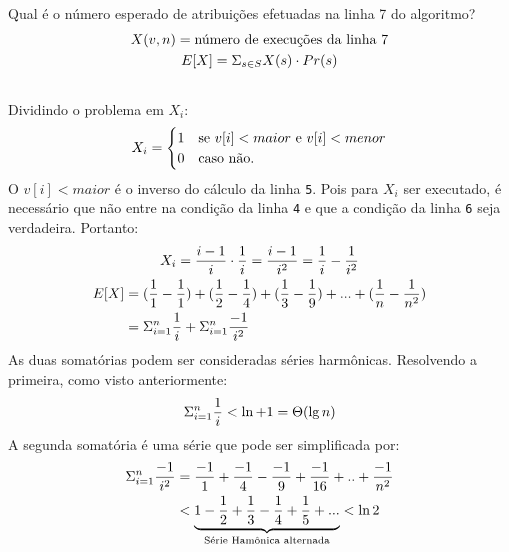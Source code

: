 \documentclass[12pt,a4paper]{article}
\begin{document}
     Qual é o número esperado de atribuições efetuadas na linha 7 do algoritmo?
    \begin{multline}
        X(v, n) = \text{número de execuções da linha 7} \\
        E[X] = \Sigma_{s \in S} X(s) \cdot Pr(s) \\
        \notag
    \end{multline}
    Dividindo o problema em $X_i$:
    \begin{equation}
        X_i =
            \begin{cases}
                1 & \text{se $v[i] < maior$ e $v[i] < menor$} \\
                0 & \text{caso não.} \\
            \end{cases}
    \notag
    \end{equation}
    O $v[i] < maior$ é o inverso do cálculo da linha \verb|5|. Pois para $X_i$
    ser executado, é necessário que não entre na condição da linha \verb|4| e
    que a condição da linha \verb|6| seja verdadeira. Portanto:
    \begin{multline}
        X_i = \frac{i-1}{i} \cdot \frac{1}{i} = \frac{i-1}{i^2} = \frac{1}{i} - \frac{1}{i^2} \\
        \begin{split}
        E[X] &= (\frac{1}{1} - \frac{1}{1} ) + (\frac{1}{2} - \frac{1}{4}) + (\frac{1}{3} - \frac{1}{9}) + ... + (\frac{1}{n} - \frac{1}{n^2}) \\
            & = \Sigma_{i=1}^n \frac{1}{i} + {\Sigma_{i=1}^n \frac{-1}{i^2} }
        \end{split}
        \notag
    \end{multline}
    As duas somatórias podem ser consideradas séries harmônicas. Resolvendo a
    primeira, como visto anteriormente:
    \begin{equation}
        \Sigma_{i=1}^n \frac{1}{i} < \ln + 1 = \Theta(\lg n)
        \notag
    \end{equation}
    A segunda somatória é uma série que pode ser simplificada por:
    \begin{equation}
        \begin{split}
        \Sigma_{i=1}^n \frac{-1}{i^2} &= \frac{-1}{1} + \frac{-1}{4} - \frac{-1}{9} + \frac{-1}{16} + .. + \frac{-1}{n^2} \\
            &< \underbrace{1 - \frac{1}{2} + \frac{1}{3} - \frac{1}{4} + \frac{1}{5} + ... }_{\text{Série Hamônica alternada} } < \ln 2 \\
        \end{split}
        \notag
    \end{equation}
\end{document}
